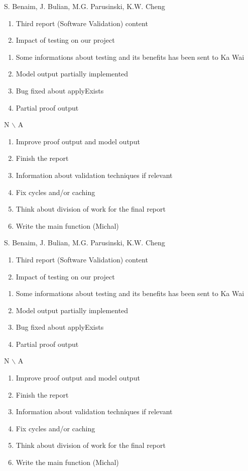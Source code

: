 %
{S. Benaim, J. Bulian, M.G. Parusinski, K.W. Cheng}%
{\begin{enumerate}
\item Third report (Software Validation) content
\item Impact of testing on our project
\end{enumerate}
}%
{\begin{enumerate}
\item Some informations about testing and its benefits has been sent to Ka Wai
\item Model output partially implemented
\item Bug fixed about applyExists
\item Partial proof output
\end{enumerate}
}%
{
{N $\backslash$ A}
}
{\begin{enumerate}
\item Improve proof output and model output
\item Finish the report
\item Information about validation techniques if relevant
\item Fix cycles and/or caching
\item Think about division of work for the final report
\item Write the main function (Michal)
\end{enumerate}}%

%
{S. Benaim, J. Bulian, M.G. Parusinski, K.W. Cheng}%
{\begin{enumerate}
\item Third report (Software Validation) content
\item Impact of testing on our project
\end{enumerate}
}%
{\begin{enumerate}
\item Some informations about testing and its benefits has been sent to Ka Wai
\item Model output partially implemented
\item Bug fixed about applyExists
\item Partial proof output
\end{enumerate}
}%
{
{N $\backslash$ A}
}
{\begin{enumerate}
\item Improve proof output and model output
\item Finish the report
\item Information about validation techniques if relevant
\item Fix cycles and/or caching
\item Think about division of work for the final report
\item Write the main function (Michal)
\end{enumerate}}%
